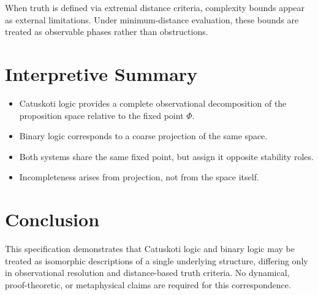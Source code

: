 \documentclass[11pt]{article}
\begin{document}
When truth is defined via extremal distance criteria,
complexity bounds appear as external limitations.
Under minimum-distance evaluation, these bounds are treated as observable phases
rather than obstructions.

\section{Interpretive Summary}

\begin{itemize}
\item Catuskoti logic provides a complete observational decomposition of the
proposition space relative to the fixed point $\Phi$.
\item Binary logic corresponds to a coarse projection of the same space.
\item Both systems share the same fixed point, but assign it opposite stability roles.
\item Incompleteness arises from projection, not from the space itself.
\end{itemize}

\section{Conclusion}

This specification demonstrates that Catuskoti logic and binary logic
may be treated as isomorphic descriptions of a single underlying structure,
differing only in observational resolution and distance-based truth criteria.
No dynamical, proof-theoretic, or metaphysical claims are required for this correspondence.
\end{document}
